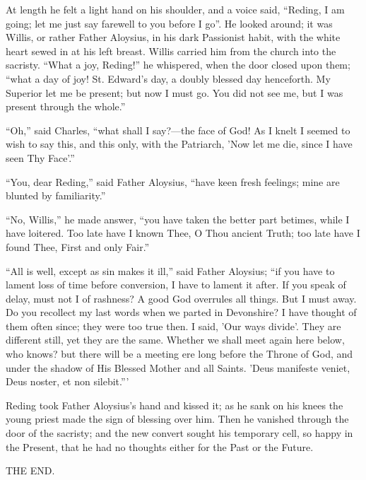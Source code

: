 At length he felt a light hand on his shoulder, and a voice said,
``Reding, I am going; let me just say farewell to you before I
go''. He looked around; it was Willis, or rather Father Aloysius,
in his dark Passionist habit, with the white heart sewed in at
his left breast. Willis carried him from the church into the sacristy.
``What a joy, Reding!'' he whispered, when the door closed
upon them; ``what a day of joy! St. Edward's day, a doubly blessed
day henceforth. My Superior let me be present; but now I must go. You
did not see me, but I was present through the whole.''

``Oh,'' said Charles, ``what shall I say?—the face of
God! As I knelt I seemed to wish to say this, and this only, with the
Patriarch, 'Now let me die, since I have seen Thy Face'.''

``You, dear Reding,'' said Father Aloysius, ``have keen
fresh feelings; mine are blunted by familiarity.''

``No, Willis,'' he made answer, ``you have taken the
better part betimes, while I have loitered. Too late have I known
Thee, O Thou ancient Truth; too late have I found Thee, First and only
Fair.''

``All is well, except as sin makes it ill,'' said Father
Aloysius; ``if you have to lament loss of time before conversion,
I have to lament it after. If you speak of delay, must not I of
rashness? A good God overrules all things. But I must away. Do you
recollect my last words when we parted in Devonshire? I have thought
of them often since; they were too true then. I said, 'Our ways
divide'. They are different still, yet they are the same. Whether we
shall meet again here below, who knows? but there will be a meeting
ere long before the Throne of God, and under the shadow of His Blessed
Mother and all Saints. 'Deus manifeste veniet, Deus noster, et non
silebit.'''

Reding took Father Aloysius's hand and kissed it; as he sank
on his knees the young priest made the sign of blessing over him. Then
he vanished through the door of the sacristy; and the new convert
sought his temporary cell, so happy in the Present, that he had no
thoughts either for the Past or the Future.

THE END.
